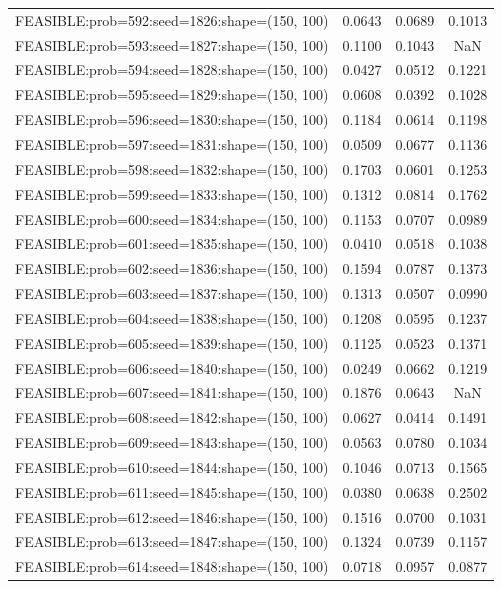 \begin{longtable}{lccc}
FEASIBLE:prob=592:seed=1826:shape=(150, 100) & 0.0643 & 0.0689 & 0.1013 \\
FEASIBLE:prob=593:seed=1827:shape=(150, 100) & 0.1100 & 0.1043 &    NaN \\
FEASIBLE:prob=594:seed=1828:shape=(150, 100) & 0.0427 & 0.0512 & 0.1221 \\
FEASIBLE:prob=595:seed=1829:shape=(150, 100) & 0.0608 & 0.0392 & 0.1028 \\
FEASIBLE:prob=596:seed=1830:shape=(150, 100) & 0.1184 & 0.0614 & 0.1198 \\
FEASIBLE:prob=597:seed=1831:shape=(150, 100) & 0.0509 & 0.0677 & 0.1136 \\
FEASIBLE:prob=598:seed=1832:shape=(150, 100) & 0.1703 & 0.0601 & 0.1253 \\
FEASIBLE:prob=599:seed=1833:shape=(150, 100) & 0.1312 & 0.0814 & 0.1762 \\
FEASIBLE:prob=600:seed=1834:shape=(150, 100) & 0.1153 & 0.0707 & 0.0989 \\
FEASIBLE:prob=601:seed=1835:shape=(150, 100) & 0.0410 & 0.0518 & 0.1038 \\
FEASIBLE:prob=602:seed=1836:shape=(150, 100) & 0.1594 & 0.0787 & 0.1373 \\
FEASIBLE:prob=603:seed=1837:shape=(150, 100) & 0.1313 & 0.0507 & 0.0990 \\
FEASIBLE:prob=604:seed=1838:shape=(150, 100) & 0.1208 & 0.0595 & 0.1237 \\
FEASIBLE:prob=605:seed=1839:shape=(150, 100) & 0.1125 & 0.0523 & 0.1371 \\
FEASIBLE:prob=606:seed=1840:shape=(150, 100) & 0.0249 & 0.0662 & 0.1219 \\
FEASIBLE:prob=607:seed=1841:shape=(150, 100) & 0.1876 & 0.0643 &    NaN \\
FEASIBLE:prob=608:seed=1842:shape=(150, 100) & 0.0627 & 0.0414 & 0.1491 \\
FEASIBLE:prob=609:seed=1843:shape=(150, 100) & 0.0563 & 0.0780 & 0.1034 \\
FEASIBLE:prob=610:seed=1844:shape=(150, 100) & 0.1046 & 0.0713 & 0.1565 \\
FEASIBLE:prob=611:seed=1845:shape=(150, 100) & 0.0380 & 0.0638 & 0.2502 \\
FEASIBLE:prob=612:seed=1846:shape=(150, 100) & 0.1516 & 0.0700 & 0.1031 \\
FEASIBLE:prob=613:seed=1847:shape=(150, 100) & 0.1324 & 0.0739 & 0.1157 \\
FEASIBLE:prob=614:seed=1848:shape=(150, 100) & 0.0718 & 0.0957 & 0.0877 \\

\end{longtable}
